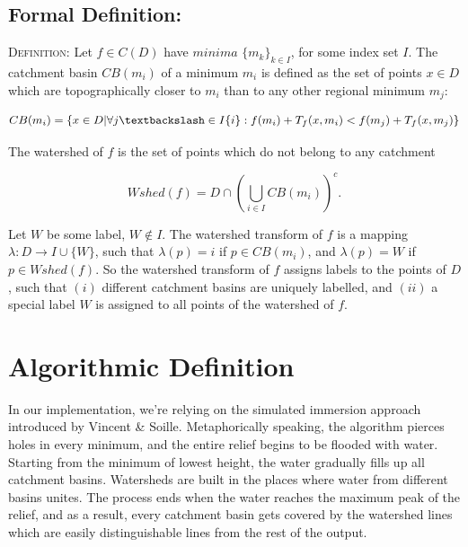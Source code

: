\documentclass{article}
\begin{document}
\subsection{Formal Definition:}
\begin{flushleft}
\vspace{2mm }
\begin{tcolorbox}
\textsc{Definition:}\cite{parwshed}\newline\newline
Let $f \in C(D)$ have $minima$ $\{m_{k}\}_{k \in I}$, for some index set $I$. The catchment basin $CB(m_i)$ of a minimum $m_i$ is defined as the set of points $x \in D$ which are topographically closer to $m_i$ than to any other regional minimum $m_j$:
\begin{center}
\begin{equation*}
CB(m_i) = \{x \in D | \forall j \textbackslash \in I\{i\} : f(m_i) + T_f(x, m_i) < f(m_j) + T_f(x, m_j)\}
\end{equation*}
\end{center}
\vspace{2mm}
The watershed of $f$ is the set of points which do not belong to any catchment
\begin{center}
\begin{equation*}
Wshed(f) = D \cap \left(\bigcup\limits_{i \in I} CB(m_i)\right)^c.
\end{equation*}
\end{center}
\vspace{4mm}
Let $W$ be some label, $W \notin I$. The watershed transform of $f$ is a mapping $\lambda : D \to I \cup \{W\}$, such that $\lambda(p) = i$ if $p \in CB(m_i)$, and $\lambda(p) = W$ if $p \in Wshed(f)$.
\newline\newline\newline
So the watershed transform of $f$ assigns labels to the points of $D$, such that $(i)$ different catchment basins are uniquely labelled, and $(ii)$ a special label $W$ is assigned to all points of the watershed of $f$.
\end{tcolorbox}
\end{flushleft}
\section{Algorithmic Definition}
\vspace{2mm}In our implementation, we're relying on the simulated immersion approach introduced by Vincent \& Soille\cite{soilletextbook}.\newline\newline
Metaphorically speaking, the algorithm pierces holes in every minimum, and the entire relief begins to be flooded with water. Starting from the minimum of lowest height, the water gradually fills up all catchment basins. Watersheds are built in the places where water from different basins unites. The process ends when the water reaches the maximum peak of the relief, and as a result, every catchment basin gets covered by the watershed lines which are easily distinguishable lines from the rest of the output.
\end{document}
